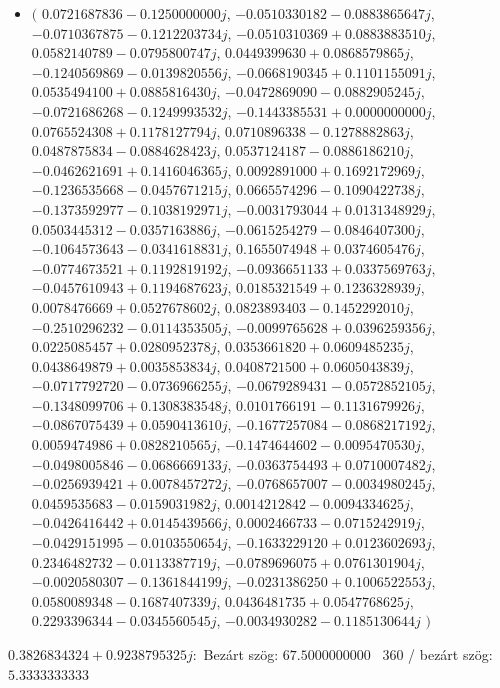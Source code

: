 \documentclass[14pt,a4paper]{article}
\begin{document}
\begin{itemize}
\item
$\big($
$0.0721687836-0.1250000000j$, $-0.0510330182-0.0883865647j$, $-0.0710367875-0.1212203734j$, $-0.0510310369+0.0883883510j$, $0.0582140789-0.0795800747j$, $0.0449399630+0.0868579865j$, $-0.1240569869-0.0139820556j$, $-0.0668190345+0.1101155091j$, $0.0535494100+0.0885816430j$, $-0.0472869090-0.0882905245j$, $-0.0721686268-0.1249993532j$, $-0.1443385531+0.0000000000j$, $0.0765524308+0.1178127794j$, $0.0710896338-0.1278882863j$, $0.0487875834-0.0884628423j$, $0.0537124187-0.0886186210j$, $-0.0462621691+0.1416046365j$, $0.0092891000+0.1692172969j$, $-0.1236535668-0.0457671215j$, $0.0665574296-0.1090422738j$, $-0.1373592977-0.1038192971j$, $-0.0031793044+0.0131348929j$, $0.0503445312-0.0357163886j$, $-0.0615254279-0.0846407300j$, $-0.1064573643-0.0341618831j$, $0.1655074948+0.0374605476j$, $-0.0774673521+0.1192819192j$, $-0.0936651133+0.0337569763j$, $-0.0457610943+0.1194687623j$, $0.0185321549+0.1236328939j$, $0.0078476669+0.0527678602j$, $0.0823893403-0.1452292010j$, $-0.2510296232-0.0114353505j$, $-0.0099765628+0.0396259356j$, $0.0225085457+0.0280952378j$, $0.0353661820+0.0609485235j$, $0.0438649879+0.0035853834j$, $0.0408721500+0.0605043839j$, $-0.0717792720-0.0736966255j$, $-0.0679289431-0.0572852105j$, $-0.1348099706+0.1308383548j$, $0.0101766191-0.1131679926j$, $-0.0867075439+0.0590413610j$, $-0.1677257084-0.0868217192j$, $0.0059474986+0.0828210565j$, $-0.1474644602-0.0095470530j$, $-0.0498005846-0.0686669133j$, $-0.0363754493+0.0710007482j$, $-0.0256939421+0.0078457272j$, $-0.0768657007-0.0034980245j$, $0.0459535683-0.0159031982j$, $0.0014212842-0.0094334625j$, $-0.0426416442+0.0145439566j$, $0.0002466733-0.0715242919j$, $-0.0429151995-0.0103550654j$, $-0.1633229120+0.0123602693j$, $0.2346482732-0.0113387719j$, $-0.0789696075+0.0761301904j$, $-0.0020580307-0.1361844199j$, $-0.0231386250+0.1006522553j$, $0.0580089348-0.1687407339j$, $0.0436481735+0.0547768625j$, $0.2293396344-0.0345560545j$, $-0.0034930282-0.1185130644j$
$\big)$
\end{itemize}
$0.3826834324+0.9238795325j$:\
Bezárt szög: $67.5000000000$ \
360 / bezárt szög: $5.3333333333$\
\end{document}
